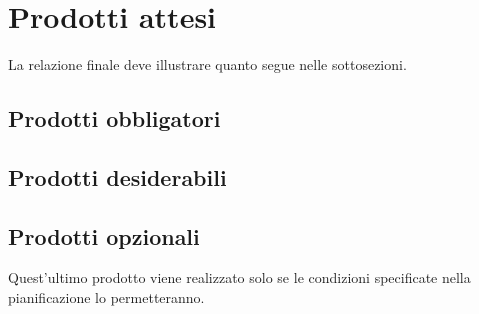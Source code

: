 \section{Prodotti attesi}
La relazione finale deve illustrare quanto segue nelle sottosezioni.
\subsection{Prodotti obbligatori}
\subsection{Prodotti desiderabili}
\subsection{Prodotti opzionali}
Quest'ultimo prodotto viene realizzato solo se le condizioni specificate nella pianificazione lo permetteranno.
